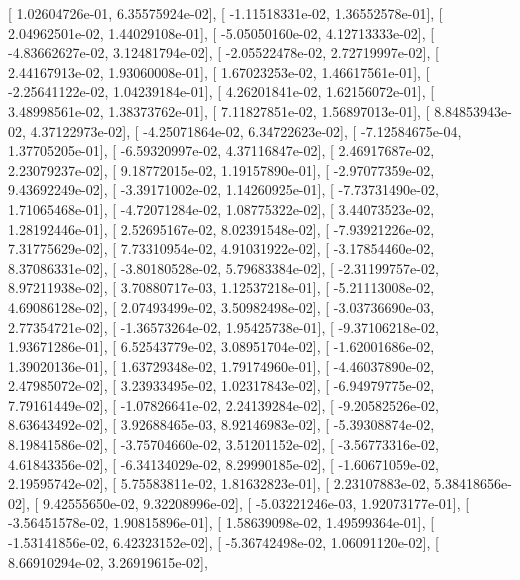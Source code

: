 \documentclass{article}
\begin{document}
       [  1.02604726e-01,   6.35575924e-02],
       [ -1.11518331e-02,   1.36552578e-01],
       [  2.04962501e-02,   1.44029108e-01],
       [ -5.05050160e-02,   4.12713333e-02],
       [ -4.83662627e-02,   3.12481794e-02],
       [ -2.05522478e-02,   2.72719997e-02],
       [  2.44167913e-02,   1.93060008e-01],
       [  1.67023253e-02,   1.46617561e-01],
       [ -2.25641122e-02,   1.04239184e-01],
       [  4.26201841e-02,   1.62156072e-01],
       [  3.48998561e-02,   1.38373762e-01],
       [  7.11827851e-02,   1.56897013e-01],
       [  8.84853943e-02,   4.37122973e-02],
       [ -4.25071864e-02,   6.34722623e-02],
       [ -7.12584675e-04,   1.37705205e-01],
       [ -6.59320997e-02,   4.37116847e-02],
       [  2.46917687e-02,   2.23079237e-02],
       [  9.18772015e-02,   1.19157890e-01],
       [ -2.97077359e-02,   9.43692249e-02],
       [ -3.39171002e-02,   1.14260925e-01],
       [ -7.73731490e-02,   1.71065468e-01],
       [ -4.72071284e-02,   1.08775322e-02],
       [  3.44073523e-02,   1.28192446e-01],
       [  2.52695167e-02,   8.02391548e-02],
       [ -7.93921226e-02,   7.31775629e-02],
       [  7.73310954e-02,   4.91031922e-02],
       [ -3.17854460e-02,   8.37086331e-02],
       [ -3.80180528e-02,   5.79683384e-02],
       [ -2.31199757e-02,   8.97211938e-02],
       [  3.70880717e-03,   1.12537218e-01],
       [ -5.21113008e-02,   4.69086128e-02],
       [  2.07493499e-02,   3.50982498e-02],
       [ -3.03736690e-03,   2.77354721e-02],
       [ -1.36573264e-02,   1.95425738e-01],
       [ -9.37106218e-02,   1.93671286e-01],
       [  6.52543779e-02,   3.08951704e-02],
       [ -1.62001686e-02,   1.39020136e-01],
       [  1.63729348e-02,   1.79174960e-01],
       [ -4.46037890e-02,   2.47985072e-02],
       [  3.23933495e-02,   1.02317843e-02],
       [ -6.94979775e-02,   7.79161449e-02],
       [ -1.07826641e-02,   2.24139284e-02],
       [ -9.20582526e-02,   8.63643492e-02],
       [  3.92688465e-03,   8.92146983e-02],
       [ -5.39308874e-02,   8.19841586e-02],
       [ -3.75704660e-02,   3.51201152e-02],
       [ -3.56773316e-02,   4.61843356e-02],
       [ -6.34134029e-02,   8.29990185e-02],
       [ -1.60671059e-02,   2.19595742e-02],
       [  5.75583811e-02,   1.81632823e-01],
       [  2.23107883e-02,   5.38418656e-02],
       [  9.42555650e-02,   9.32208996e-02],
       [ -5.03221246e-03,   1.92073177e-01],
       [ -3.56451578e-02,   1.90815896e-01],
       [  1.58639098e-02,   1.49599364e-01],
       [ -1.53141856e-02,   6.42323152e-02],
       [ -5.36742498e-02,   1.06091120e-02],
       [  8.66910294e-02,   3.26919615e-02],
\end{document}
